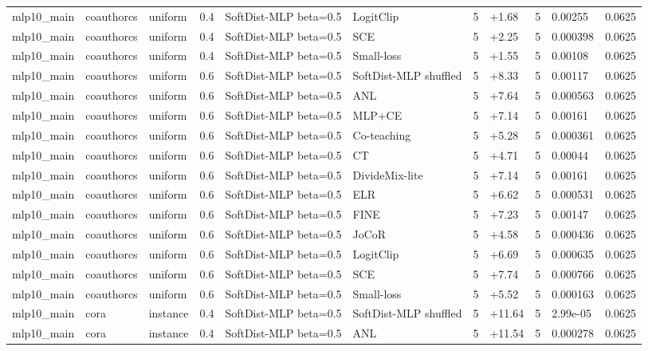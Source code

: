 \begin{table}[t]
\begin{tabular}{llllllrlrll}
mlp10_main & coauthorcs & uniform & 0.4 & SoftDist-MLP beta=0.5 & LogitClip & 5 & +1.68 & 5 & 0.00255 & 0.0625 \\
mlp10_main & coauthorcs & uniform & 0.4 & SoftDist-MLP beta=0.5 & SCE & 5 & +2.25 & 5 & 0.000398 & 0.0625 \\
mlp10_main & coauthorcs & uniform & 0.4 & SoftDist-MLP beta=0.5 & Small-loss & 5 & +1.55 & 5 & 0.00108 & 0.0625 \\
mlp10_main & coauthorcs & uniform & 0.6 & SoftDist-MLP beta=0.5 & SoftDist-MLP shuffled & 5 & +8.33 & 5 & 0.00117 & 0.0625 \\
mlp10_main & coauthorcs & uniform & 0.6 & SoftDist-MLP beta=0.5 & ANL & 5 & +7.64 & 5 & 0.000563 & 0.0625 \\
mlp10_main & coauthorcs & uniform & 0.6 & SoftDist-MLP beta=0.5 & MLP+CE & 5 & +7.14 & 5 & 0.00161 & 0.0625 \\
mlp10_main & coauthorcs & uniform & 0.6 & SoftDist-MLP beta=0.5 & Co-teaching & 5 & +5.28 & 5 & 0.000361 & 0.0625 \\
mlp10_main & coauthorcs & uniform & 0.6 & SoftDist-MLP beta=0.5 & CT & 5 & +4.71 & 5 & 0.00044 & 0.0625 \\
mlp10_main & coauthorcs & uniform & 0.6 & SoftDist-MLP beta=0.5 & DivideMix-lite & 5 & +7.14 & 5 & 0.00161 & 0.0625 \\
mlp10_main & coauthorcs & uniform & 0.6 & SoftDist-MLP beta=0.5 & ELR & 5 & +6.62 & 5 & 0.000531 & 0.0625 \\
mlp10_main & coauthorcs & uniform & 0.6 & SoftDist-MLP beta=0.5 & FINE & 5 & +7.23 & 5 & 0.00147 & 0.0625 \\
mlp10_main & coauthorcs & uniform & 0.6 & SoftDist-MLP beta=0.5 & JoCoR & 5 & +4.58 & 5 & 0.000436 & 0.0625 \\
mlp10_main & coauthorcs & uniform & 0.6 & SoftDist-MLP beta=0.5 & LogitClip & 5 & +6.69 & 5 & 0.000635 & 0.0625 \\
mlp10_main & coauthorcs & uniform & 0.6 & SoftDist-MLP beta=0.5 & SCE & 5 & +7.74 & 5 & 0.000766 & 0.0625 \\
mlp10_main & coauthorcs & uniform & 0.6 & SoftDist-MLP beta=0.5 & Small-loss & 5 & +5.52 & 5 & 0.000163 & 0.0625 \\
mlp10_main & cora & instance & 0.4 & SoftDist-MLP beta=0.5 & SoftDist-MLP shuffled & 5 & +11.64 & 5 & 2.99e-05 & 0.0625 \\
mlp10_main & cora & instance & 0.4 & SoftDist-MLP beta=0.5 & ANL & 5 & +11.54 & 5 & 0.000278 & 0.0625 \\

\end{tabular}
\end{table}
